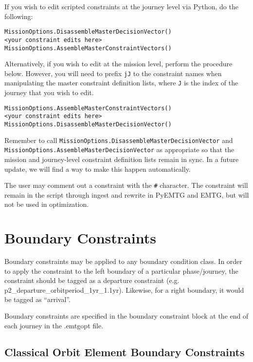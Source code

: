\documentclass[11pt]{article}
\begin{document}
If you wish to edit scripted constraints at the journey level via Python, do the following:

\begin{verbatim}
MissionOptions.DisassembleMasterDecisionVector()
<your constraint edits here>
MissionOptions.AssembleMasterConstraintVectors()
\end{verbatim}

Alternatively, if you wish to edit at the mission level, perform the procedure below. However, you will need to prefix \texttt{jJ} to the constraint names when manipulating the master constraint definition lists, where \texttt{J} is the index of the journey that you wish to edit.

\begin{verbatim}
MissionOptions.AssembleMasterConstraintVectors()
<your constraint edits here>
MissionOptions.DisassembleMasterDecisionVector()
\end{verbatim}

Remember to call \texttt{MissionOptions.DisassembleMasterDecisionVector} and \texttt{MissionOptions.AssembleMasterDecisionVector} as appropriate so that the mission and journey-level constraint definition lists remain in sync. In a future update, we will find a way to make this happen automatically.

The user may comment out a constraint with the \texttt{\#} character. The constraint will remain in the script through ingest and rewrite in PyEMTG and EMTG, but will not be used in optimization.

\section{Boundary Constraints}
\label{sec:boundaryConstraints}

Boundary constraints may be applied to any boundary condition class. In order to apply the constraint to the left boundary of a particular phase/journey, the constraint should be tagged as a departure constraint (e.g. p2\_departure\_orbitperiod\_1yr\_1.1yr). Likewise, for a right boundary, it would be tagged as ``arrival''.

Boundary constraints are specified in the boundary constraint block at the end of each journey in the .emtgopt file.

\subsection{Classical Orbit Element Boundary Constraints}
\label{sec:boundaryCOEconstraints}
\end{document}
